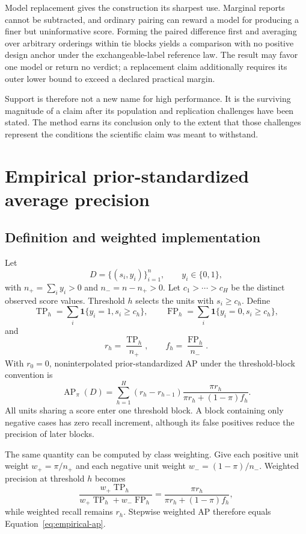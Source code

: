 \documentclass[11pt]{article}
\newcommand{\AP}{\operatorname{AP}}
\theoremstyle{remark}
\begin{document}
Model replacement gives the construction its sharpest use. Marginal reports cannot be subtracted, and ordinary pairing can reward a model for producing a finer but uninformative score. Forming the paired difference first and averaging over arbitrary orderings within tie blocks yields a comparison with no positive design anchor under the exchangeable-label reference law. The result may favor one model or return no verdict; a replacement claim additionally requires its outer lower bound to exceed a declared practical margin.

Support is therefore not a new name for high performance. It is the surviving magnitude of a claim after its population and replication challenges have been stated. The method earns its conclusion only to the extent that those challenges represent the conditions the scientific claim was meant to withstand.

\appendix

\section{Empirical prior-standardized average precision}
\label{app:ap}

\subsection{Definition and weighted implementation}

Let
\[
D=\{(s_i,y_i)\}_{i=1}^{n},
\qquad
y_i\in\{0,1\},
\]
with $n_+=\sum_i y_i>0$ and $n_-=n-n_+>0$. Let $c_1>\cdots>c_H$ be the distinct observed score values. Threshold $h$ selects the units with $s_i\geq c_h$. Define
\[
\operatorname{TP}_h
=
\sum_i\mathbf 1\{y_i=1,s_i\geq c_h\},
\qquad
\operatorname{FP}_h
=
\sum_i\mathbf 1\{y_i=0,s_i\geq c_h\},
\]
and
\[
r_h=\frac{\operatorname{TP}_h}{n_+},
\qquad
f_h=\frac{\operatorname{FP}_h}{n_-}.
\]
With $r_0=0$, noninterpolated prior-standardized AP under the threshold-block convention is
\begin{equation}
\AP_\pi(D)
=
\sum_{h=1}^{H}
(r_h-r_{h-1})
\frac{\pi r_h}
{\pi r_h+(1-\pi)f_h}.
\label{eq:empirical-ap}
\end{equation}
All units sharing a score enter one threshold block. A block containing only negative cases has zero recall increment, although its false positives reduce the precision of later blocks.

The same quantity can be computed by class weighting. Give each positive unit weight $w_+=\pi/n_+$ and each negative unit weight $w_-=(1-\pi)/n_-$. Weighted precision at threshold $h$ becomes
\[
\frac{w_+\operatorname{TP}_h}
{w_+\operatorname{TP}_h+w_-\operatorname{FP}_h}
=
\frac{\pi r_h}
{\pi r_h+(1-\pi)f_h},
\]
while weighted recall remains $r_h$. Stepwise weighted AP therefore equals Equation~\eqref{eq:empirical-ap}.
\end{document}

